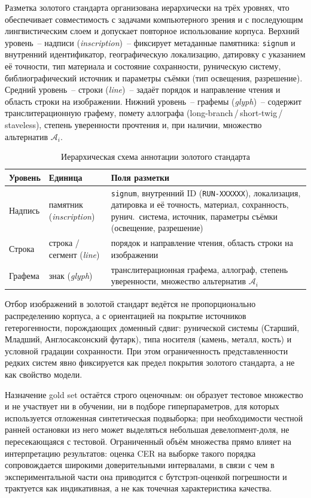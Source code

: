 \documentclass[a4paper,12pt]{extarticle}
\begin{document}
Разметка золотого стандарта организована иерархически на трёх уровнях, что обеспечивает совместимость с задачами компьютерного зрения и с последующим лингвистическим слоем и допускает повторное использование корпуса. Верхний уровень~-- надписи (\textit{inscription})~-- фиксирует метаданные памятника: \texttt{signum} и внутренний идентификатор, географическую локализацию, датировку с указанием её точности, тип материала и состояние сохранности, руническую систему, библиографический источник и параметры съёмки (тип освещения, разрешение). Средний уровень~-- строки (\textit{line})~-- задаёт порядок и направление чтения и область строки на изображении. Нижний уровень~-- графемы (\textit{glyph})~-- содержит транслитерационную графему, помету аллографа (long-branch\,/\,short-twig\,/\,staveless), степень уверенности прочтения и, при наличии, множество альтернатив $\mathcal{A}_i$.
 
\begin{table}[htbp]
\centering
\caption{Иерархическая схема аннотации золотого стандарта}
\label{tab:annotation-schema}
\small
\begin{tabular}{p{2.6cm} p{3.7cm} p{6.4cm}}
\hline
\textbf{Уровень} & \textbf{Единица} & \textbf{Поля разметки} \\
\hline
Надпись & памятник (\textit{inscription}) & \texttt{signum}, внутренний ID (\texttt{RUN-XXXXXX}), локализация, датировка и её точность, материал, сохранность, рунич.\ система, источник, параметры съёмки (освещение, разрешение) \\
Строка & строка / сегмент (\textit{line}) & порядок и направление чтения, область строки на изображении \\
Графема & знак (\textit{glyph}) & транслитерационная графема, аллограф, степень уверенности, множество альтернатив $\mathcal{A}_i$ \\
\hline
\end{tabular}
\end{table}
 
Отбор изображений в золотой стандарт ведётся не пропорционально распределению корпуса, а с ориентацией на покрытие источников гетерогенности, порождающих доменный сдвиг: рунической системы (Старший, Младший, Англосаксонский футарк), типа носителя (камень, металл, кость) и условной градации сохранности. При этом ограниченность представленности редких систем явно фиксируется как предел покрытия золотого стандарта, а не как свойство модели.
 
Назначение gold set остаётся строго оценочным: он образует тестовое множество и не участвует ни в обучении, ни в подборе гиперпараметров, для которых используется отложенная синтетическая подвыборка; при необходимости честной ранней остановки из него может выделяться небольшая девелопмент-доля, не пересекающаяся с тестовой. Ограниченный объём множества прямо влияет на интерпретацию результатов: оценка CER на выборке такого порядка сопровождается широкими доверительными интервалами, в связи с чем в экспериментальной части она приводится с бутстрэп-оценкой погрешности и трактуется как индикативная, а не как точечная характеристика качества.
\end{document}
